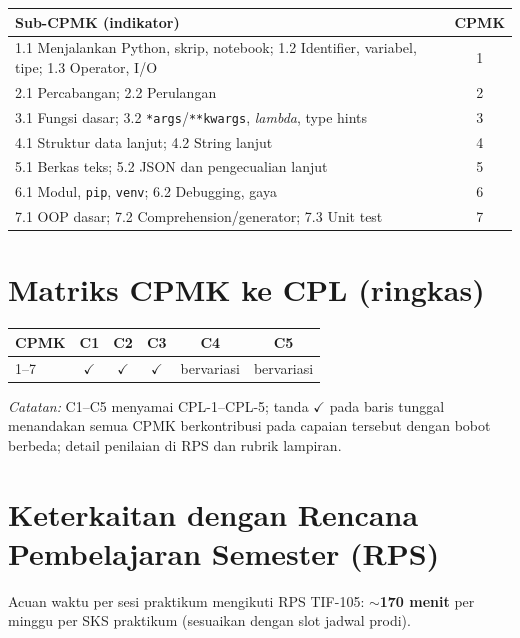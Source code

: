\documentclass[../main.tex]{subfiles}
\begin{document}
{\small
\begin{tabular}{|p{7.8cm}|c|}
\hline
\textbf{Sub-CPMK (indikator)} & \textbf{CPMK} \\
\hline
1.1 Menjalankan Python, skrip, notebook; 1.2 Identifier, variabel, tipe; 1.3 Operator, I/O & 1 \\
\hline
2.1 Percabangan; 2.2 Perulangan & 2 \\
\hline
3.1 Fungsi dasar; 3.2 \texttt{*args}/\texttt{**kwargs}, \textit{lambda}, type hints & 3 \\
\hline
4.1 Struktur data lanjut; 4.2 String lanjut & 4 \\
\hline
5.1 Berkas teks; 5.2 JSON dan pengecualian lanjut & 5 \\
\hline
6.1 Modul, \texttt{pip}, \texttt{venv}; 6.2 Debugging, gaya & 6 \\
\hline
7.1 OOP dasar; 7.2 Comprehension/generator; 7.3 Unit test & 7 \\
\hline
\end{tabular}
}

\section{Matriks CPMK ke CPL (ringkas)}

{\small
\begin{tabular}{|l|c|c|c|c|c|}
\hline
\textbf{CPMK} & \textbf{C1} & \textbf{C2} & \textbf{C3} & \textbf{C4} & \textbf{C5} \\
\hline
1--7 & $\checkmark$ & $\checkmark$ & $\checkmark$ & bervariasi & bervariasi \\
\hline
\end{tabular}
}

\noindent\textit{Catatan:} C1--C5 menyamai CPL-1--CPL-5; tanda $\checkmark$ pada baris tunggal menandakan semua CPMK berkontribusi pada capaian tersebut dengan bobot berbeda; detail penilaian di RPS dan rubrik lampiran.

\section{Keterkaitan dengan Rencana Pembelajaran Semester (RPS)}

Acuan waktu per sesi praktikum mengikuti RPS TIF-105: \textbf{$\sim$170 menit} per minggu per SKS praktikum (sesuaikan dengan slot jadwal prodi).
\end{document}

